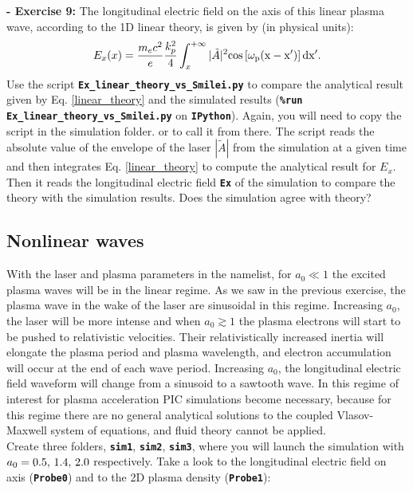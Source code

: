 \documentclass{article}
\newcommand{\commandline}[1]{\texttt{\textbf{#1}}}
\begin{document}
\textbf{ - Exercise 9:} The longitudinal electric field on the axis of this linear plasma wave, according to the 1D linear theory, is given by (in physical units):
\begin{equation}\label{linear_theory}
E_x(x) = \frac{m_e c^2}{e}\frac{k_p^2}{4} \int_x^{+\infty} |\tilde{A}|^2\rm{cos}\left[\omega_p(x-x')\right]dx'.\\
\end{equation}
Use the script \commandline{Ex\_linear\_theory\_vs\_Smilei.py} to compare the analytical result given by Eq. \ref{linear_theory} and the simulated results (\commandline{\%run Ex\_linear\_theory\_vs\_Smilei.py} on \commandline{IPython}). Again, you will need to copy the script in the simulation folder. or to call it from there. The script reads the absolute value of the envelope of the laser $|\tilde{A}|$ from the simulation at a given time and then integrates Eq. \ref{linear_theory} to compute the analytical result for $E_x$. Then it reads the longitudinal electric field \commandline{Ex} of the simulation to compare the theory with the simulation results. Does the simulation agree with theory?

\subsection {Nonlinear waves}
With the laser and plasma parameters in the namelist, for $a_0\ll1$ the excited plasma waves will be in the linear regime. As we saw in the previous exercise, the plasma wave in the wake of  the laser are sinusoidal in this regime.
Increasing $a_0$, the laser will be more intense and when $a_0\gtrsim1$ the plasma electrons will start to  be pushed to relativistic velocities. Their relativistically increased inertia will elongate the plasma period and plasma wavelength, and electron accumulation will occur at the end of each wave period. Increasing $a_0$, the longitudinal electric field waveform will change from a sinusoid to a sawtooth wave. In this regime of interest for plasma acceleration PIC simulations become necessary, because for this regime there are no general analytical solutions to the coupled Vlasov-Maxwell system of equations,  and fluid theory cannot be applied.\\

Create three folders, \commandline{sim1}, \commandline{sim2}, \commandline{sim3}, where you will launch the simulation  with $a_0=0.5,\thinspace 1.4,\thinspace 2.0$ respectively. Take a look to the longitudinal electric field on axis (\commandline{Probe0}) and to the 2D plasma density (\commandline{Probe1}):\\
\end{document}
